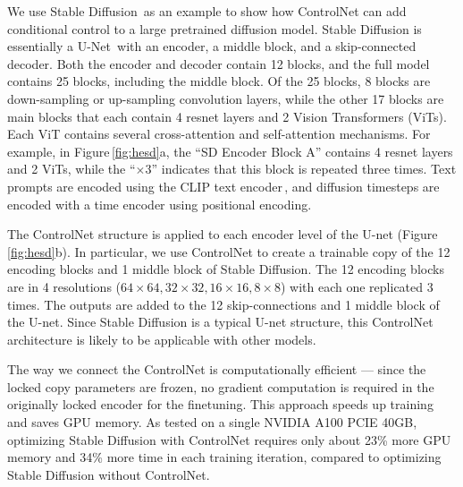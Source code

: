 \documentclass[10pt,twocolumn,letterpaper]{article}
\begin{document}
	We use Stable Diffusion\,\cite{rombach2021highresolution} as an
	example to show how ControlNet can add conditional control to a large
	pretrained diffusion model.  Stable Diffusion is essentially a
	U-Net\,\cite{ronneberger2015u} with an encoder, a middle block, and a
	skip-connected decoder. Both the encoder and decoder contain 12
	blocks, and the full model contains 25 blocks, including the middle
	block. Of the 25 blocks, 8 blocks are down-sampling or up-sampling
	convolution layers, while the other 17 blocks are main blocks that
	each contain 4 resnet layers and 2 Vision Transformers (ViTs).  Each
	ViT contains several cross-attention and self-attention mechanisms.
	For example, in Figure\,\ref{fig:hesd}a, the
	``SD Encoder Block A'' contains 4 resnet layers and 2 ViTs, while the 
	``$\times 3$'' indicates that this block is repeated three times.
	Text prompts are encoded using the CLIP text encoder\,\cite{radford2021learning}, and diffusion timesteps are encoded
	with a time encoder using positional encoding.
	
	The ControlNet structure is applied to each encoder level of the U-net
	(Figure\,\ref{fig:hesd}b).  In particular, we use ControlNet to create a
	trainable copy of the 12 encoding blocks and 1 middle block of Stable
	Diffusion. The 12 encoding blocks are in 4 resolutions
	($64\times64,32\times32,16\times16,8\times8$) with each one replicated 3
	times.  The outputs are added to the 12 skip-connections and 1 middle
	block of the U-net.  Since Stable Diffusion is a typical U-net structure, this
	ControlNet architecture is likely to be applicable with other
	models.
	
	The way we connect the ControlNet is computationally efficient ---
	since the locked copy parameters are frozen, no gradient computation
	is required in the originally locked encoder for the finetuning.  This
	approach speeds up training and saves GPU memory. As tested on a
	single NVIDIA A100 PCIE 40GB, optimizing Stable Diffusion with
	ControlNet requires only about 23\% more GPU memory and 34\% more time
	in each training iteration, compared to optimizing Stable Diffusion
	without ControlNet.
	
\end{document}
